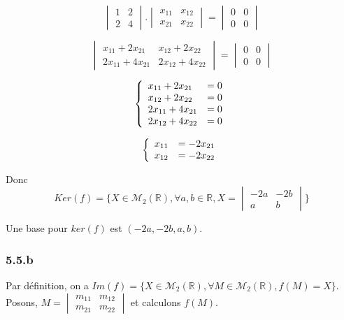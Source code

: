 \documentclass[]{book}
\theoremstyle{definition}
\newcommand{\bb}[1]{\mathbb{#1}}
\newcommand{\R}{\bb{R}}
\begin{document}
$$
\begin{vmatrix} 1 & 2 \\ 2 & 4 \end{vmatrix} . \begin{vmatrix} x_{11} & x_{12} \\ x_{21} & x_{22} \end{vmatrix} = \begin{vmatrix} 0 & 0 \\ 0 & 0 \end{vmatrix}
$$

$$
\begin{vmatrix} x_{11}+2x_{21} & x_{12}+2x_{22} \\ 2x_{11}+4x_{21} & 2x_{12}+4x_{22} \end{vmatrix} = \begin{vmatrix} 0 & 0 \\ 0 & 0 \end{vmatrix}
$$

$$
\left\{ 
\begin{array}{l l}
x_{11}+2x_{21} & = 0 \\
x_{12}+2x_{22} & = 0\\
2x_{11}+4x_{21}  & = 0 \\
2x_{12}+4x_{22} & = 0 \\
\end{array}
\right. 
$$

$$
\left\{ 
\begin{array}{l l}
x_{11} & = -2x_{21} \\
x_{12} & = -2x_{22}\\
\end{array}
\right. 
$$

Donc 
$$
Ker(f) = \{X \in \mathcal{M}_2(\R),\forall a,b \in  \R, X=\begin{vmatrix} -2a & -2b \\ a & b \end{vmatrix} \}
$$

Une base pour $ker(f)$ est $(-2a,-2b,a,b)$.

\subsubsection*{5.5.b}
Par d\'efinition, on a $Im(f) = \{X \in \mathcal{M}_2(\R), \forall M \in \mathcal{M}_2(\R), f(M) = X \}$. Posons, $M=\begin{vmatrix} m_{11} & m_{12} \\ m_{21} & m_{22} \end{vmatrix}$ et calculons $f(M)$.
\end{document}
